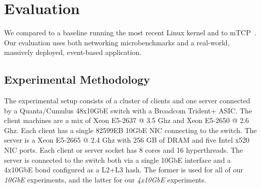 
\section{Evaluation}
\label{sec:eval}

We compared \ix to a baseline running the most recent Linux kernel and to
mTCP~\cite{jeong2014mtcp}. Our evaluation uses both networking
microbenchmarks and a real-world, massively deployed, event-based
application.

\subsection{Experimental Methodology}
\label{sec:eval:setup}



 





The experimental setup consists of a cluster of  clients
and one server connected by  
a Quanta/Cumulus 48x10GbE switch with a Broadcom Trident+ ASIC.
The client machines are a mix of Xeon E5-2637 @ 3.5 Ghz and Xeon
E5-2650 @ 2.6 Ghz.  Each client has a single 82599EB 10GbE NIC
connecting to the switch.  The server is a Xeon E5-2665 @ 2.4 Ghz with
256 GB of DRAM and five Intel x520 NIC ports.  Each client or server
socket has 8 cores and 16 hyperthreads.  The server is connected
to the switch both via a single 10GbE interface and a 4x10GbE bond configured as a L2+L3 hash.  The former is used for all of our \emph{10GbE} experiments, and the latter for our \emph{4x10GbE} experiments. 

